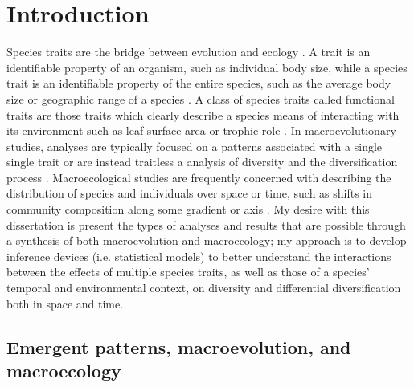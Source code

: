 \chapter{Introduction} \label{ch:intro}


Species traits are the bridge between evolution and ecology \citep{Mcgill2006,Weber2017}. A trait is an identifiable property of an organism, such as individual body size, while a species trait is an identifiable property of the entire species, such as the average body size or geographic range of a species \citep{Mcgill2006}. A class of species traits called functional traits are those traits which clearly describe a species means of interacting with its environment such as leaf surface area or trophic role \citep{Mcgill2006}. In macroevolutionary studies, analyses are typically focused on a patterns associated with a single single trait or are instead traitless a analysis of diversity and the diversification process \citep{Silvestro2014a,Silvestro2015b,Pires2015a,Rabosky2013,Slater2015c,Hunt2007a,Hunt2006a,Liow2008,Payne2007}. Macroecological studies are frequently concerned with describing the distribution of species and individuals over space or time, such as shifts in community composition along some gradient or axis \citep{Smith2008b,Smith2004,Brown1995,Brown1989,Bush2007,Eronen2009,Fortelius2002,Jernvall2002,Jernvall2004}. My desire with this dissertation is present the types of analyses and results that are possible through a synthesis of both macroevolution and macroecology; my approach is to develop inference devices (i.e. statistical models) to better understand the interactions between the effects of multiple species traits, as well as those of a species' temporal and environmental context, on diversity and differential diversification both in space and time.


\section{Emergent patterns, macroevolution, and macroecology}

